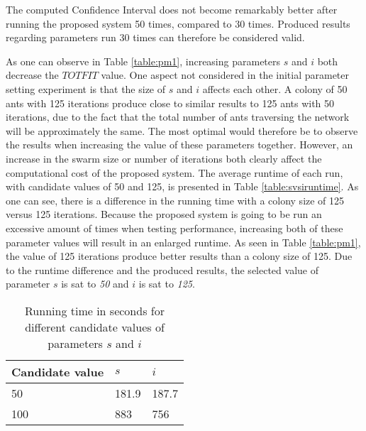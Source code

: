The computed Confidence Interval does not become remarkably better after running the proposed system 50 times, compared to 30 times. Produced results regarding parameters run 30 times can therefore be considered valid.
\newline

As one can observe in Table \vref{table:pm1}, increasing parameters $s$ and $i$ both decrease the $TOTFIT$ value. One aspect not considered in the initial parameter setting experiment is that the size of $s$ and $i$ affects each other. A colony of 50 ants with 125 iterations produce close to similar results to 125 ants with 50 iterations, due to the fact that the total number of ants traversing the network will be approximately the same. The most optimal would therefore be to observe the results when increasing the value of these parameters together. However, an increase in the swarm size or number of iterations both clearly affect the computational cost of the proposed system. The average runtime of each run, with candidate values of 50 and 125, is presented in Table \vref{table:svsiruntime}. As one can see, there is a difference in the running time with a colony size of 125 versus 125 iterations. Because the proposed system is going to be run an excessive amount of times when testing performance, increasing both of these parameter values will result in an enlarged runtime. As seen in Table \ref{table:pm1}, the value of 125 iterations produce better results than a colony size of 125. Due to the runtime difference and the produced results, the selected value of parameter $s$ is sat to \textit{50} and $i$ is sat to \textit{125}.

\begin{table}[H]
    \centering
    \begin{tabular}{|l|l|l|}
    \hline
    \textbf{Candidate value} & \textbf{$s$} & \textbf{$i$}\\
    \hline
    50 & 181.9 & 187.7 \\
    100 & 883 & 756\\
    \hline
    \end{tabular}
    \caption {Running time in seconds for different candidate values of parameters $s$ and $i$}
    \label{table:svsiruntime}
    \end{table}


